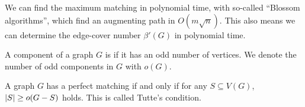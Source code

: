 We can find the maximum matching in polynomial time, with so-called
\enquote{Blossom algorithms}, which find an augmenting path in $O(m \sqrt{n})$.
This also means we can determine the edge-cover number $\beta'(G)$ in polynomial
time.


\begin{definition}
  A component of a graph $G$ is  if it has an odd number of vertices.
  We denote the number of odd components in $G$ with $o(G)$.
\end{definition}

\begin{theorem}[Tutte]
  A graph $G$ has a perfect matching if and only if for any $S \subseteq V(G)$,
  $\left| S \right| \ge o(G - S)$ holds.
  This is called Tutte's condition.
\end{theorem}


